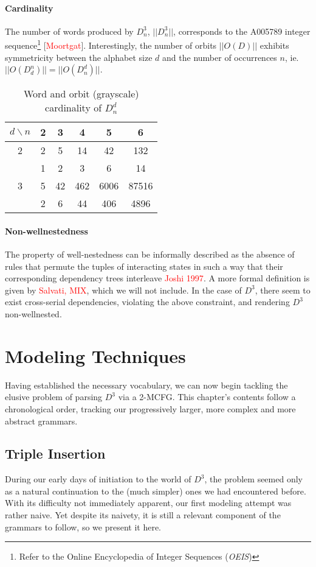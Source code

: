 \documentclass[nonatbib,numbers,10pt]{sigplanconf}
\newcommand\todo[1]{\textcolor{red}{#1}}
\begin{document}
\paragraph{Cardinality}
The number of words produced by $D^3_n$, $| \! | D^3_n | \! |$, corresponds to the A005789 integer sequence\footnote{Refer to the Online Encyclopedia of Integer Sequences (\textit{OEIS})} [\todo{Moortgat}].
Interestingly, the number of orbits $| \! | O(D) | \! |$ exhibits symmetricity between the alphabet size $d$ and the number of occurrences $n$, ie. $| \! | O(D^n_d) | \! | = | \! | O(D^d_n) | \! |$.
\begin{table}[h!]
\begin{center}
\begin{tabular}{c | c c c c c }
$d \backslash n$ & 2 & 3 & 4 & 5 & 6\\
\hline
2 & 2 & 5 & 14 & 42 & 132\\
\rowcolor{Gray}
\ & 1 & 2 & 3 & 6 & 14\\
3 & 5 & 42 & 462 & 6006 & 87516\\
\rowcolor{Gray}
\ & 2 & 6 & 44 & 406 & 4896\\
\end{tabular}
\end{center}
\caption{Word and orbit (grayscale) cardinality of $D^d_n$}
\end{table}
\paragraph{Non-wellnestedness}
The property of well-nestedness can be informally described as the absence of rules that permute the tuples of interacting states in such a way that their corresponding dependency trees interleave \todo{Joshi 1997}. A more formal definition is given by \todo{Salvati, MIX}, which we will not include. In the case of $D^3$, there seem to exist cross-serial dependencies, violating the above constraint, and rendering $D^3$ non-wellnested.

\section{Modeling Techniques}
Having established the necessary vocabulary, we can now begin tackling the elusive problem of parsing $D^3$ via a 2-MCFG. This chapter's contents follow a chronological order, tracking our progressively larger, more complex and more abstract grammars.
\subsection{Triple Insertion}
During our early days of initiation to the world of $D^3$, the problem seemed only as a natural continuation to the (much simpler) ones we had encountered before. With its difficulty not immediately apparent, our first modeling attempt was rather naive. Yet despite its naivety, it is still a relevant component of the grammars to follow, so we present it here.
\end{document}
